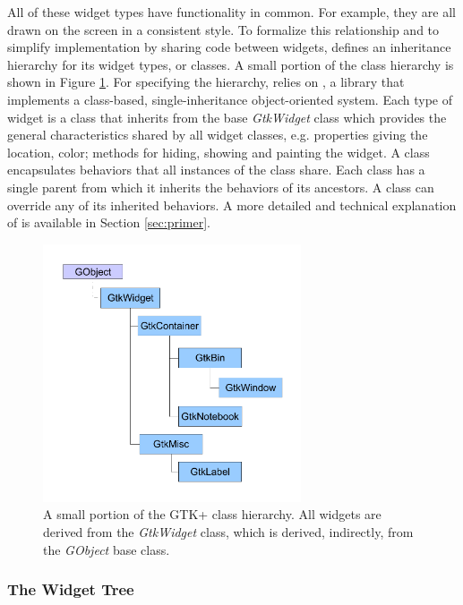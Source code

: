 \documentclass[article]{jss}
\begin{document}
All of these widget types have functionality in common. For example, they are
all drawn on the screen in a consistent style. To formalize this relationship 
and to simplify implementation by sharing code
between widgets,  defines an inheritance hierarchy for its widget
types, or classes. A small portion of the  class hierarchy is shown
in Figure \ref{fig:class-hierarchy}. For specifying the hierarchy,  
relies on , a  library that implements a class-based, single-inheritance 
object-oriented system.  Each type of  widget is a  
class that inherits from the base \emph{GtkWidget} class  which
provides the general characteristics shared by all widget classes,
e.g. properties giving the location, color; methods for hiding,
showing and painting the widget. A  
class encapsulates behaviors that all instances of the class share. 
Each class has a single parent from which it inherits 
the behaviors of its ancestors. A class can override any of its inherited behaviors.
A more detailed and technical explanation of  is available in 
Section \ref{sec:primer}. 

\begin{figure}
\begin{center}
\includegraphics[width=3in]{class-hierarchy.pdf}
\caption{\label{fig:class-hierarchy}A small portion of the GTK+ class hierarchy. 
All widgets are derived from the \emph{GtkWidget} class, which is derived, 
indirectly, from the \emph{GObject} base class.}
\end{center}
\end{figure}

\subsubsection{The Widget Tree}
\end{document}
